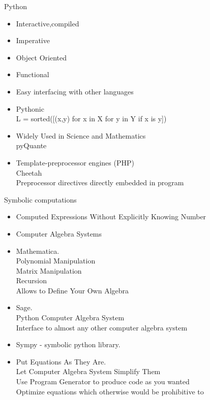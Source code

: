\documentclass{beamer}
\begin{document}
\begin{frame}{  Python}
\begin{itemize}
\item Interactive,compiled 
\item Imperative
\item Object Oriented
\item Functional
\item Easy interfacing with other languages
\item Pythonic\\
 L = sorted([(x,y) for x in X for y in Y if x is y])
\item Widely Used in Science and Mathematics\\
pyQuante
\item  Template-preprocessor engines (PHP)\\
  Cheetah\\
Preprocessor directives directly embedded in program\\
\end{itemize}
\end{frame}

\begin{frame}{ Symbolic computations}
\begin{itemize}
\item Computed Expressions Without Explicitly Knowing Number
\item Computer Algebra Systems
\item Mathematica.\\
  Polynomial Manipulation\\
Matrix Manipulation\\
Recursion\\
Allows to Define Your Own Algebra\\
\item  Sage.\\
    Python Computer Algebra System\\
    Interface to almost any other computer algebra system
\item Sympy - symbolic python library.\\
\item  Put Equations As They Are.\\
Let Computer Algebra System Simplify Them\\
Use Program Generator to produce code as you  wanted\\
Optimize equations which otherwise would be prohibitive to
\end{itemize}
\end{frame}
\end{document}
